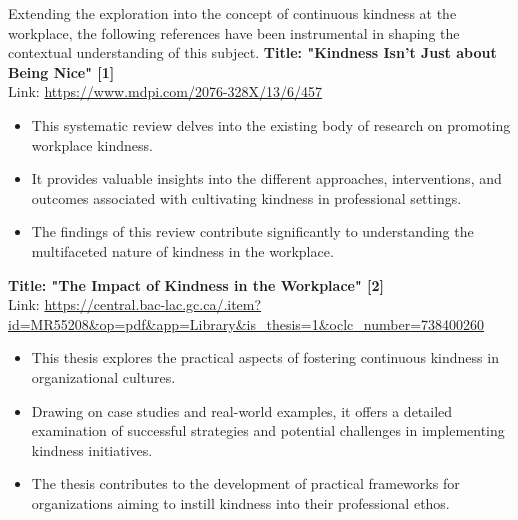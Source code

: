 \documentclass[a4paper, 11pt]{report}
\begin{document}
Extending the exploration into the concept of continuous kindness at the workplace, the following references have been instrumental in shaping the contextual understanding of this subject.
\vspace{5mm} %
\newline
\noindent\textbf{Title: "Kindness Isn’t Just about Being Nice" [1]} 
\\
Link: \url{https://www.mdpi.com/2076-328X/13/6/457}
\begin{itemize}
    \item This systematic review delves into the existing body of research on promoting workplace kindness. 
    \item It provides valuable insights into the different approaches, interventions, and outcomes associated with cultivating kindness in professional settings.
    \item The findings of this review contribute significantly to understanding the multifaceted nature of kindness in the workplace.
\end{itemize}

\vspace{5mm} %

\noindent\textbf{Title: "The Impact of Kindness in the Workplace" [2]}
\\
Link: \url{https://central.bac-lac.gc.ca/.item?id=MR55208&op=pdf&app=Library&is_thesis=1&oclc_number=738400260}
\begin{itemize}
    \item This thesis explores the practical aspects of fostering continuous kindness in organizational cultures.
    \item Drawing on case studies and real-world examples, it offers a detailed examination of successful strategies and potential challenges in implementing kindness initiatives.
    \item The thesis contributes to the development of practical frameworks for organizations aiming to instill kindness into their professional ethos.
\end{itemize}
\vspace{5mm} %
\end{document}

